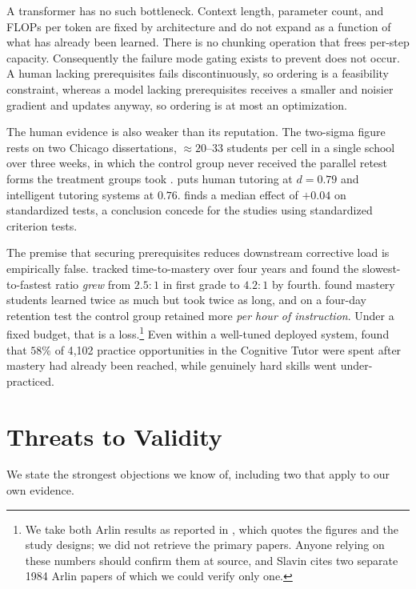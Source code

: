 \documentclass[11pt]{article}
\theoremstyle{plain}
\theoremstyle{definition}
\theoremstyle{remark}
\begin{document}
A transformer has no such bottleneck. Context length, parameter count, and FLOPs
per token are fixed by architecture and do not expand as a function of what has
already been learned. There is no chunking operation that frees per-step
capacity. Consequently the failure mode gating exists to prevent does not occur.
A human lacking prerequisites fails discontinuously, so ordering is a feasibility
constraint, whereas a model lacking prerequisites receives a smaller and noisier
gradient and updates anyway, so ordering is at most an optimization.

The human evidence is also weaker than its reputation.
The two-sigma figure rests on two Chicago dissertations, ${\approx}20$--$33$
students per cell in a single school over three weeks, in which the control group
never received the parallel retest forms the treatment groups took
\citep{anania1983influence,bloom1984twosigma}. \citet{vanlehn2011relative} puts
human tutoring at $d = 0.79$ and intelligent tutoring systems at $0.76$.
\citet{slavin1987mastery} finds a median effect of $+0.04$ on standardized tests,
a conclusion \citet{kulik1990effectiveness} concede for the studies using
standardized criterion tests.

The premise that securing prerequisites reduces downstream corrective load is
empirically false. \citet{arlin1984time} tracked time-to-mastery over four years
and found the slowest-to-fastest ratio \emph{grew} from $2.5{:}1$ in first grade
to $4.2{:}1$ by fourth. \citet{arlin1983time} found mastery students
learned twice as much but took twice as long, and on a four-day retention test
the control group retained more \emph{per hour of instruction}. Under a fixed
budget, that is a loss.\footnote{We take both Arlin results as reported in
\citet{slavin1987mastery}, which quotes the figures and the study designs; we did
not retrieve the primary papers. Anyone relying on these numbers should confirm
them at source, and Slavin cites two separate 1984 Arlin papers of which we could
verify only one.} Even within a well-tuned deployed system,
\citet{cen2007overpractice} found that $58\%$ of 4{,}102 practice opportunities
in the Cognitive Tutor were spent after mastery had already been reached, while
genuinely hard skills went under-practiced.

\section{Threats to Validity}
\label{sec:threats}

We state the strongest objections we know of, including two that apply to our own
evidence.
\end{document}
